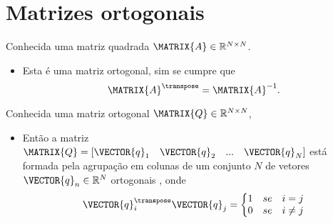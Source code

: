 \section{ Matrizes ortogonais}


\begin{definition}\label{def:ortogonalmatrix0}
Conhecida uma matriz quadrada $\MATRIX{A} \in \mathbb{R}^{N \times N}$. 
\begin{itemize}
\item Esta é uma matriz ortogonal, sim se cumpre que \cite[pp. 66]{golub2013matrix}
\begin{equation}
\MATRIX{A}^{\transpose} = \MATRIX{A}^{-1}.
\end{equation}
\end{itemize}
\end{definition}

\begin{theorem}\label{theo:ortogonalmatrix0}
Conhecida uma matriz ortogonal $\MATRIX{Q} \in \mathbb{R}^{N \times N}$,
\begin{itemize}
\item Então a matriz $\MATRIX{Q}=\left[\VECTOR{q}_1\quad \VECTOR{q}_2\quad ... \quad \VECTOR{q}_N \right]$
está formada pela agrupação em colunas de um conjunto $N$ de vetores $\VECTOR{q}_n \in \mathbb{R}^{N}$
ortogonais \cite[pp. 66]{golub2013matrix}, onde 
\begin{equation}
\VECTOR{q}_i^{\transpose}\VECTOR{q}_j=
\left\{ 
\begin{matrix}
1 & se & i = j\\
0 & se & i \neq j
\end{matrix}
\right.
\end{equation} 
\end{itemize}
\end{theorem}

